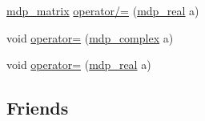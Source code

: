 \begin{DoxyCompactItemize}
\item 
\hyperlink{classmdp__matrix}{mdp\+\_\+matrix} \hyperlink{classmdp__matrix_abc83a95f12ed5f697213cf9d812a99cd}{operator/=} (\hyperlink{mdp__global__vars_8h_a69d96b74c791e0bbdb888b3913a69450}{mdp\+\_\+real} a)
\item 
void \hyperlink{classmdp__matrix_a3d8e6aca507fe6daada3b337ba2e027e}{operator=} (\hyperlink{classmdp__complex}{mdp\+\_\+complex} a)
\item 
void \hyperlink{classmdp__matrix_a87d932535b5e5b0f28943a76a867d983}{operator=} (\hyperlink{mdp__global__vars_8h_a69d96b74c791e0bbdb888b3913a69450}{mdp\+\_\+real} a)
\end{DoxyCompactItemize}
\subsection*{Friends}
